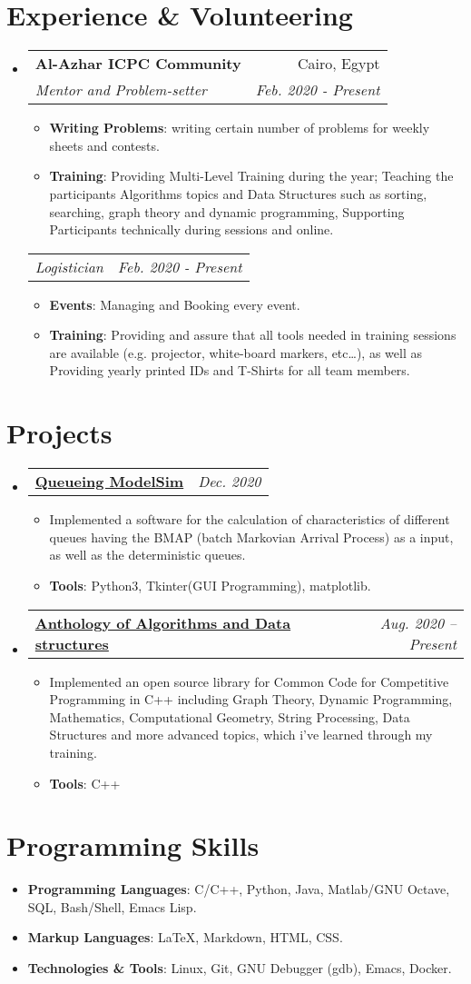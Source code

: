 \documentclass[letterpaper, 11pt]{article}
\makeatletter
\newcommand{\Item}[2]{\item\small{\textbf{#1}{#2 \vspace{-2pt}}}}
\newcommand{\SubSecListBeg}{\begin{itemize}[leftmargin=*]}
\newcommand{\SubSecListEnd}{\end{itemize}}
\newcommand{\ItemListBeg}{\begin{itemize}}
\newcommand{\ItemListEnd}{\end{itemize}\vspace{-5pt}}
\newcommand{\subsecfourtwoitalic}[4] {
	\vspace{-1pt}\item
	\begin{tabular*}{0.97\textwidth}[t]{l@{\extracolsep{\fill}}r}
		\textbf{#1} & #2 \\
		\textit{\small#3} & \textit{\small #4} \\
	\end{tabular*}\vspace{-5pt}
}
\newcommand{\subsubsectwoitalic}[2] {
	\begin{tabular*}{0.97\textwidth}{l@{\extracolsep{\fill}}r}
		\textit{\small#1} & \textit{\small #2} \\
	\end{tabular*}\vspace{-5pt}
}
\newcommand{\subsectwooneitalic}[2] {
	\vspace{-1pt}\item
	\begin{tabular*}{0.97\textwidth}[t]{l@{\extracolsep{\fill}}r}
		\textbf{#1} & \textit{\small #2} \\
	\end{tabular*}\vspace{-5pt}
}
\makeatother
\begin{document}
\section{Experience \& Volunteering}
\SubSecListBeg
	\subsecfourtwoitalic
	{Al-Azhar ICPC Community}{Cairo, Egypt}
	{Mentor and Problem-setter}{Feb. 2020 - Present}
      	\ItemListBeg
        	\Item{Writing Problems}
        	{: writing certain number of problems for weekly sheets and contests.}
		\Item{Training}
		{: Providing Multi-Level Training during the year; Teaching the participants Algorithms topics and Data Structures such as sorting, searching, graph theory and dynamic programming, Supporting Participants technically during sessions and online.}
      	\ItemListEnd
	\subsubsectwoitalic
	{Logistician}{Feb. 2020 - Present}
	\ItemListBeg
        	\Item{Events}
        	{: Managing and Booking every event.}
        	\Item{Training}
          	{: Providing and assure that all tools needed in training sessions are available (e.g. projector, white-board markers, etc…), as well as Providing yearly printed IDs and T-Shirts for all team members.}
      	\ItemListEnd
\SubSecListEnd


\section{Projects}
\SubSecListBeg
	\subsectwooneitalic
	{\faIcon{user-clock} \href{https://github.com/AbdeltwabMF/Queueing-ModelSim}{Queueing ModelSim}}{Dec. 2020}
	\ItemListBeg
		\Item{}{Implemented a software for the calculation of characteristics of different queues having the BMAP (batch Markovian Arrival Process) as a input, as well as the deterministic queues.}
		\Item{Tools}
		{: Python3, Tkinter(GUI Programming), matplotlib.}
	\ItemListEnd

	\subsectwooneitalic
	{\faIcon{laptop-code} \href{https://github.com/AbdeltwabMF/Anthology-of-Algorithms-and-Data-structures}{Anthology of Algorithms and Data structures}}{Aug. 2020 -- Present}
	\ItemListBeg
		\Item{}{Implemented an open source library for Common Code for Competitive Programming in C++ including Graph Theory, Dynamic Programming, Mathematics, Computational Geometry, String Processing, Data Structures and more advanced topics, which i've learned through my training.}
		\Item{Tools}
		{: C++}
	\ItemListEnd
\SubSecListEnd

\section{Programming Skills}
\SubSecListBeg
	\Item{Programming Languages}{: C/C++, Python, Java, Matlab/GNU Octave, SQL, Bash/Shell, Emacs Lisp.}
	\Item{Markup Languages}{: \LaTeX, Markdown, HTML, CSS.}
	\Item{Technologies \& Tools}{: Linux, Git, GNU Debugger (gdb), Emacs, Docker.}
\SubSecListEnd
\end{document}
